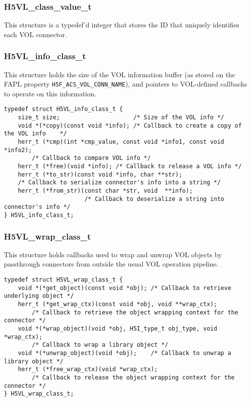 \subsubsection{H5VL\_class\_value\_t}

This structure is a typedef'd integer that stores the ID that uniquely identifies each VOL connector.


\subsubsection{H5VL\_info\_class\_t}

This structure holds the size of the VOL information buffer (as stored on the FAPL property \texttt{H5F\_ACS\_VOL\_CONN\_NAME}), and pointers to VOL-defined callbacks to operate on this information.

\begin{verbatim}
typedef struct H5VL_info_class_t {
    size_t size;                     /* Size of the VOL info */
    void *(*copy)(const void *info); /* Callback to create a copy of the VOL info    */
    herr_t (*cmp)(int *cmp_value, const void *info1, const void *info2); 
        /* Callback to compare VOL info */
    herr_t (*free)(void *info); /* Callback to release a VOL info */
    herr_t (*to_str)(const void *info, char **str);
    /* Callback to serialize connector's info into a string */
    herr_t (*from_str)(const char *str, void  **info); 
                       /* Callback to deserialize a string into connector's info */
} H5VL_info_class_t;
\end{verbatim}

\subsubsection{H5VL\_wrap\_class\_t}

This structure holds callbacks used to wrap and unwrap VOL objects by passthrough connectors from outside the usual VOL operation pipeline.


\begin{verbatim}
typedef struct H5VL_wrap_class_t {
    void *(*get_object)(const void *obj); /* Callback to retrieve underlying object */
    herr_t (*get_wrap_ctx)(const void *obj, void **wrap_ctx); 
        /* Callback to retrieve the object wrapping context for the connector */
    void *(*wrap_object)(void *obj, H5I_type_t obj_type, void *wrap_ctx); 
        /* Callback to wrap a library object */
    void *(*unwrap_object)(void *obj);    /* Callback to unwrap a library object */
    herr_t (*free_wrap_ctx)(void *wrap_ctx); 
        /* Callback to release the object wrapping context for the connector */
} H5VL_wrap_class_t;
\end{verbatim}


